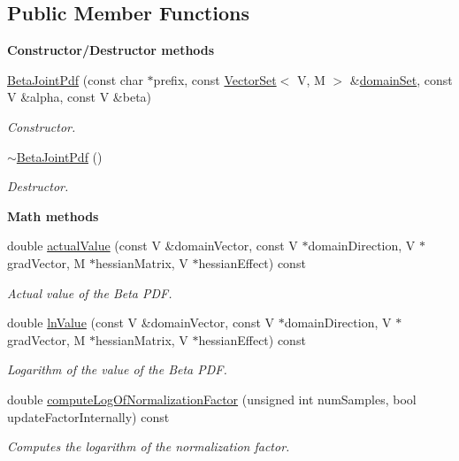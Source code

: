 \subsection*{Public Member Functions}
\begin{Indent}{\bf Constructor/\-Destructor methods}\par
\begin{DoxyCompactItemize}
\item 
\hyperlink{class_q_u_e_s_o_1_1_beta_joint_pdf_a82b8baf377f485ac028207983a73618e}{Beta\-Joint\-Pdf} (const char $\ast$prefix, const \hyperlink{class_q_u_e_s_o_1_1_vector_set}{Vector\-Set}$<$ V, M $>$ \&\hyperlink{class_q_u_e_s_o_1_1_base_scalar_function_ad0937628825249dd36ded3ce0c7959ac}{domain\-Set}, const V \&alpha, const V \&beta)
\begin{DoxyCompactList}\small\item\em Constructor. \end{DoxyCompactList}\item 
\hyperlink{class_q_u_e_s_o_1_1_beta_joint_pdf_aaa4264f75e61e066b44ab545a3d1ae39}{$\sim$\-Beta\-Joint\-Pdf} ()
\begin{DoxyCompactList}\small\item\em Destructor. \end{DoxyCompactList}\end{DoxyCompactItemize}
\end{Indent}
\begin{Indent}{\bf Math methods}\par
\begin{DoxyCompactItemize}
\item 
double \hyperlink{class_q_u_e_s_o_1_1_beta_joint_pdf_a14909bee55e4d764be71e7a313716d9b}{actual\-Value} (const V \&domain\-Vector, const V $\ast$domain\-Direction, V $\ast$grad\-Vector, M $\ast$hessian\-Matrix, V $\ast$hessian\-Effect) const 
\begin{DoxyCompactList}\small\item\em Actual value of the Beta P\-D\-F. \end{DoxyCompactList}\item 
double \hyperlink{class_q_u_e_s_o_1_1_beta_joint_pdf_a713d655107dd51eac9d1c19630359a06}{ln\-Value} (const V \&domain\-Vector, const V $\ast$domain\-Direction, V $\ast$grad\-Vector, M $\ast$hessian\-Matrix, V $\ast$hessian\-Effect) const 
\begin{DoxyCompactList}\small\item\em Logarithm of the value of the Beta P\-D\-F. \end{DoxyCompactList}\item 
double \hyperlink{class_q_u_e_s_o_1_1_beta_joint_pdf_aaa67d058285caffa8dcb0235fbaf7726}{compute\-Log\-Of\-Normalization\-Factor} (unsigned int num\-Samples, bool update\-Factor\-Internally) const 
\begin{DoxyCompactList}\small\item\em Computes the logarithm of the normalization factor. \end{DoxyCompactList}\end{DoxyCompactItemize}
\end{Indent}
